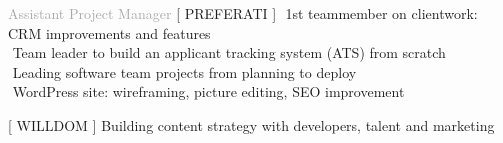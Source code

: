
\begin{cvtable}

\bigskip

{\textcolor{darkgray}{Assistant Project Manager}}%
{[ {P\scriptsize REFERATI} ]}%
{%
     \textperiodcentered $ $ 1st teammember on clientwork: CRM improvements and features \\
     \textperiodcentered $ $ Team leader to build an applicant tracking system (ATS) from scratch \\
     \textperiodcentered $ $ Leading software team projects from planning to deploy \\
     \textperiodcentered $ $ WordPress site: wireframing, picture editing, SEO improvement %
} %
 
\bigskip
 
{\textcolor{darkgray}{}}%
{[ {W\scriptsize ILL}{D\scriptsize OM} ]}%
{%
    Building content strategy
    with developers, talent and marketing %
} 

\bigskip


\end{cvtable}

